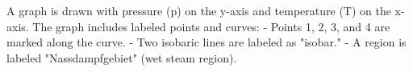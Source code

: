 A graph is drawn with pressure (p) on the y-axis and temperature (T) on the x-axis. The graph includes labeled points and curves:  
- Points 1, 2, 3, and 4 are marked along the curve.  
- Two isobaric lines are labeled as "isobar."  
- A region is labeled "Nassdampfgebiet" (wet steam region).